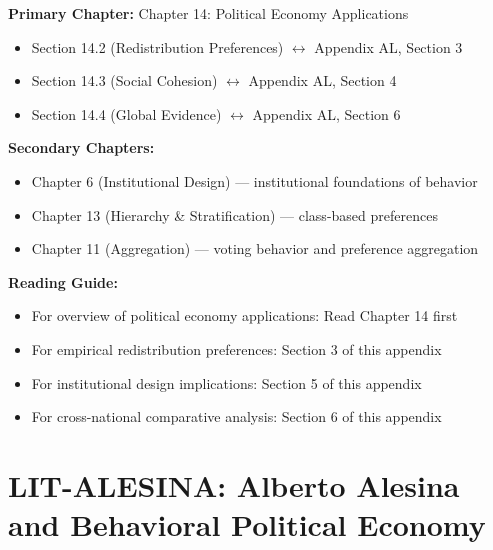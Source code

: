 \begin{tcolorbox}[colback=purple!5!white, colframe=purple!75!black,
    title=Chapter Linkage]

\textbf{Primary Chapter:} Chapter 14: Political Economy Applications
\begin{itemize}[nosep]
\item Section 14.2 (Redistribution Preferences) $\leftrightarrow$ Appendix AL, Section 3
\item Section 14.3 (Social Cohesion) $\leftrightarrow$ Appendix AL, Section 4
\item Section 14.4 (Global Evidence) $\leftrightarrow$ Appendix AL, Section 6
\end{itemize}

\textbf{Secondary Chapters:}
\begin{itemize}[nosep]
\item Chapter 6 (Institutional Design) --- institutional foundations of behavior
\item Chapter 13 (Hierarchy \& Stratification) --- class-based preferences
\item Chapter 11 (Aggregation) --- voting behavior and preference aggregation
\end{itemize}

\textbf{Reading Guide:}
\begin{itemize}[nosep]
\item For overview of political economy applications: Read Chapter 14 first
\item For empirical redistribution preferences: Section 3 of this appendix
\item For institutional design implications: Section 5 of this appendix
\item For cross-national comparative analysis: Section 6 of this appendix
\end{itemize}

\end{tcolorbox}

\clearpage


\section*{LIT-ALESINA: Alberto Alesina and Behavioral Political Economy}

